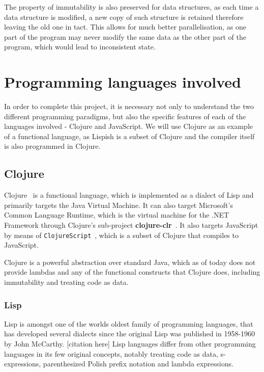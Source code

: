 The property of immutability is also preserved for data structures, as each time a data structure is modified, a new copy of such structure is retained therefore leaving the old one in tact. This allows for much better parallelisation, as one part of the program may never modify the same data as the other part of the program, which would lead to inconsistent state.

\section{Programming languages involved}
In order to complete this project, it is necessary not only to understand the two different programming paradigms, but also the specific features of each of the languages involved - Clojure and JavaScript.
We will use Clojure as an example of a functional language, as Lispish is a subset of Clojure and the compiler itself is also programmed in Clojure.

\subsection{Clojure}
Clojure~\cite{Clojure:2013:Site} is a functional language, which is implemented as a dialect of Lisp and primarily targets the Java Virtual Machine. It can also target Microsoft's Common Language Runtime, which is the virtual machine for the .NET Framework through Clojure's sub-project \textbf{clojure-clr}~\cite{clojure-clr}. 
It also targets JavaScript by means of \texttt{ClojureScript}~\cite{ClojureScript:2013:Site}, which is a subset of Clojure that compiles to JavaScript. 

Clojure is a powerful abstraction over standard Java, which as of today does not provide lambdas and any of the functional constructs that Clojure does, including immutability and treating code as data.

\subsubsection{Lisp}

Lisp is amongst one of the worlds oldest family of programming languages, that has developed several dialects since the original Lisp was published in 1958-1960 by John McCarthy. [citation here]
Lisp languages differ from other programming languages 
in its few original concepts, notably treating code as data, s-expressions, parenthesized Polish prefix notation and lambda expressions.

